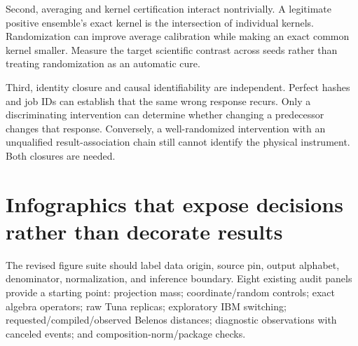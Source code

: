 \documentclass[11pt,a4paper]{article}
\begin{document}
Second, averaging and kernel certification interact nontrivially. A legitimate positive ensemble's exact kernel is the intersection of individual kernels. Randomization can improve average calibration while making an exact common kernel smaller. Measure the target scientific contrast across seeds rather than treating randomization as an automatic cure.

Third, identity closure and causal identifiability are independent. Perfect hashes and job IDs can establish that the same wrong response recurs. Only a discriminating intervention can determine whether changing a predecessor changes that response. Conversely, a well-randomized intervention with an unqualified result-association chain still cannot identify the physical instrument. Both closures are needed.

\section{Infographics that expose decisions rather than decorate results}
The revised figure suite should label data origin, source pin, output alphabet, denominator, normalization, and inference boundary. Eight existing audit panels provide a starting point: projection mass; coordinate/random controls; exact algebra operators; raw Tuna replicas; exploratory IBM switching; requested/compiled/observed Belenos distances; diagnostic observations with canceled events; and composition-norm/package checks.
\end{document}
